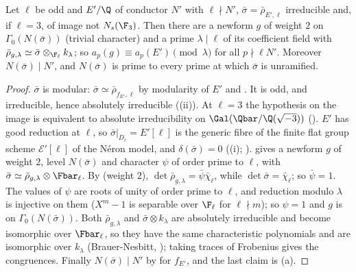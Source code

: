 \begin{corollary}\label{cor:modgalrep:optimal-level-E}
Let $\ell$ be odd and $E'/\Q$ of conductor $N'$ with $\ell\nmid N'$, $\bar\sigma=\bar\rho_{E',\ell}$ irreducible and, if $\ell=3$, of image not $N_s(\F_3)$. Then there are a newform $g$ of
weight $2$ on $\Gamma_0(N(\bar\sigma))$ (trivial character) and a prime $\lambda\mid\ell$ of its coefficient field with $\bar\rho_{g,\lambda}\simeq\bar\sigma\otimes_{\F_\ell}k_\lambda$; so $a_p(g)\equiv a_p(E')\pmod\lambda$
for all $p\nmid\ell N'$. Moreover $N(\bar\sigma)\mid N'$, and $N(\bar\sigma)$ is prime to every prime at which $\bar\sigma$ is unramified.
\end{corollary}

\begin{proof}
$\bar\sigma$ is modular: $\bar\sigma\simeq\bar\rho_{f_{E'},\ell}$ by modularity of $E'$ and . It is odd, and irreducible, hence absolutely
irreducible ((ii)). At $\ell=3$ the hypothesis on the image is equivalent to absolute irreducibility on $\Gal(\Qbar/\Q(\sqrt{-3}))$
(). $E'$ has good reduction at $\ell$, so $\bar\sigma|_{D_\ell}=E'[\ell]$ is the generic fibre of the finite flat group scheme $\mathcal E'[\ell]$ of the N\'eron
model, and $\delta(\bar\sigma)=0$ ((i); ).  gives a newform $g$ of weight $2$, level $N(\bar\sigma)$
and character $\psi$ of order prime to $\ell$, with $\bar\sigma\simeq\bar\rho_{g,\lambda}\otimes\Fbar_\ell$. By  (weight $2$), $\det\bar\rho_{g,\lambda}=\bar\psi\bar\chi_\ell$, while
$\det\bar\sigma=\bar\chi_\ell$; so $\bar\psi=1$. The values of $\psi$ are roots of unity of order prime to $\ell$, and reduction modulo $\lambda$ is injective on them ($X^m-1$ is
separable over $\F_\ell$ for $\ell\nmid m$); so $\psi=1$ and $g$ is on $\Gamma_0(N(\bar\sigma))$. Both $\bar\rho_{g,\lambda}$ and $\bar\sigma\otimes k_\lambda$ are absolutely irreducible and become
isomorphic over $\Fbar_\ell$, so they have the same characteristic polynomials and are isomorphic over $k_\lambda$ (Brauer-Nesbitt, ); taking traces of
Frobenius gives the congruences. Finally $N(\bar\sigma)\mid N'$ by  for $f_{E'}$, and the last claim is
(a).
\end{proof}

